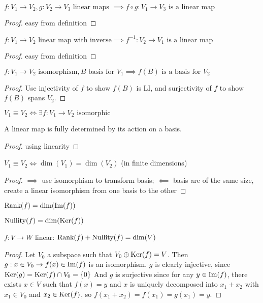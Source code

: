 \begin{property}
	$f:V_1 \to V_2, g:V_2 \to V_3 \text{ linear maps } \implies f \circ g:V_1 \to V_3 \text{ is a linear map}$
\end{property}
\begin{proof}
	easy from definition
\end{proof}
\begin{property}
	$f:V_1 \to V_2 \text{ linear map with inverse} \implies f^{-1}:V_2 \to V_1 \text{ is a linear map}$
\end{property}
\begin{proof}
	easy from definition
\end{proof}

\begin{property}
	$f:V_1 \to V_2 \text{ isomorphism}, B \text{ basis for } V_1 \implies f(B) \text{ is a basis for } V_2$ 
\end{property}
\begin{proof}
	Use injectivity of $f$ to show $f(B)$ is LI, and surjectivity of $f$ to show $f(B)$ spans $V_2$.
\end{proof}
\begin{notation}
	$V_1 \equiv V_2 \iff \exists f:V_1 \to V_2 \text{ isomorphic}$
\end{notation}
\begin{property}
	A linear map is fully determined by its action on a basis.
\end{property}
\begin{proof}
	using linearity
\end{proof}
\begin{property}
	$V_1 \equiv V_2 \iff \dim(V_1)=\dim(V_2)$ (in finite dimensions)
\end{property}
\begin{proof}
	$\implies$ use isomorphism to transform basis; $\impliedby$ basis are of the same size, create a linear isomorphism from one basis to the other
\end{proof}

\begin{definition}
	$\text{Rank}(f)=\dim(\text{Im}(f))$
\end{definition}
\begin{definition}
	$\text{Nullity}(f)=\dim(\text{Ker}(f))$
\end{definition}
\begin{theorem}
	$f:V \to W$ linear: $\text{Rank}(f)+\text{Nullity}(f)=\dim(V)$
\end{theorem}
\begin{proof}
	Let $V_0$ a subspace such that $V_0 \oplus \text{Ker}(f) = V$.
	Then $g:x \in V_0 \to f(x) \in \text{Im}(f)$ is an isomorphism.
	$g$ is clearly injective, since $\text{Ker}(g)=\text{Ker}(f) \cap V_0 = \{0\}$
	And $g$ is surjective since for any $y \in \text{Im}(f)$, there exists $x \in V$ such that $f(x)=y$ and $x$ is uniquely decomposed into $x_1 + x_2$ with $x_1 \in V_0$ and $x_2 \in \text{Ker}(f)$, so $f(x_1+x_2)=f(x_1)=g(x_1)=y$.

\end{proof}

